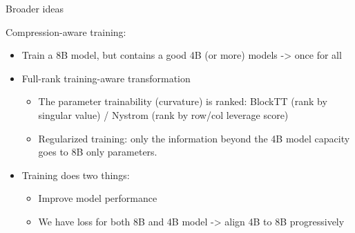 \documentclass[9pt]{beamer}
\begin{document}
	\begin{frame}{Broader ideas}
		
		
		Compression-aware training:
		\begin{itemize}
			\item Train a 8B model, but contains a good 4B (or more) models -> once for all
			
			\item Full-rank training-aware transformation
			\begin{itemize}
				\item The parameter trainability (curvature) is ranked: BlockTT (rank by singular value) / Nystrom (rank by row/col leverage score)
				\item Regularized training: only the information beyond the 4B model capacity goes to 8B only parameters.
			\end{itemize} 
			
			\item Training does two things:
			\begin{itemize}
				\item Improve model performance
				\item We have loss for both 8B and 4B model -> align 4B to 8B progressively
			\end{itemize}
			
			
			 
		\end{itemize}
		
		
	\end{frame}
	
	
	
	
\end{document}
